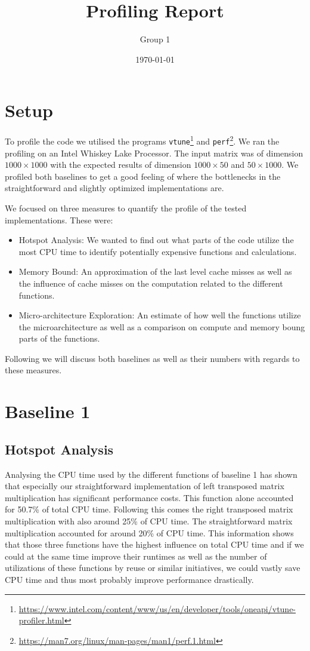 \documentclass[11pt]{article}
\title{Profiling Report}
\author{ Group 1 }
\date{\today}
\begin{document}
\maketitle	

\section*{Setup}

To profile the code we utilised the programs \texttt{vtune}\footnote{\url{https://www.intel.com/content/www/us/en/developer/tools/oneapi/vtune-profiler.html}} and \texttt{perf}\footnote{\url{https://man7.org/linux/man-pages/man1/perf.1.html}}. We ran the profiling on an Intel Whiskey Lake Processor. The input matrix was of dimension $1000 \times 1000$ with the expected results of dimension $1000 \times 50$ and $50 \times 1000$. We profiled both baselines to get a good feeling of where the bottlenecks in the straightforward and slightly optimized implementations are.

We focused on three measures to quantify the profile of the tested implementations. These were:

\begin{itemize}
    \item Hotspot Analysis: We wanted to find out what parts of the code utilize the most CPU time to identify potentially expensive functions and calculations.
    \item Memory Bound: An approximation of the last level cache misses as well as the influence of cache misses on the computation related to the different functions.
    \item Micro-architecture Exploration: An estimate of how well the functions utilize the microarchitecture as well as a comparison on compute and memory boung parts of the functions.
\end{itemize}

Following we will discuss both baselines as well as their numbers with regards to these measures.

\section*{Baseline 1}

\subsection*{Hotspot Analysis}

Analysing the CPU time used by the different functions of baseline 1 has shown that especially our straightforward implementation of left transposed matrix multiplication has significant performance costs. This function alone accounted for 50.7\% of total CPU time. Following this comes the right transposed matrix multiplication with also around 25\% of CPU time. The straightforward matrix multiplication accounted for around 20\% of CPU time. This information shows that those three functions have the highest influence on total CPU time and if we could at the same time improve their runtimes as well as the number of utilizations of these functions by reuse or similar initiatives, we could vastly save CPU time and thus most probably improve performance drastically.
\end{document}
